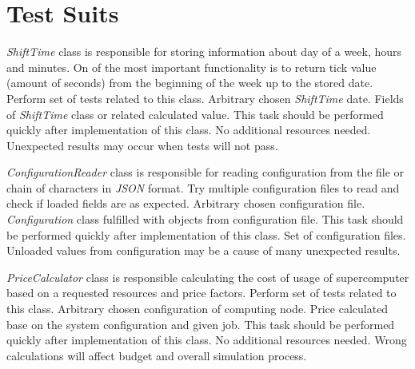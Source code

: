\chapter{Test Suits} \label{chp:test-suits}
	{
		{
			\emph{ShiftTime} class is responsible for storing information about day of a week, hours and minutes. On of the most important functionality is to return tick value (amount of seconds) from the beginning of the week up to the stored date.
		}
		{
			Perform set of tests related to this class. 
		}
		{
			Arbitrary chosen \emph{ShiftTime} date.   
		}
		{
			Fields of \emph{ShiftTime} class or related calculated value.
		}
		{
			This task should be performed quickly after implementation of this class.
		}
		{
			No additional resources needed.
		}
		{
			Unexpected results may occur when tests will not pass. 
		}
	}

	{
		{
			\emph{ConfigurationReader} class is responsible for reading configuration from the file or chain of characters in \emph{JSON} format.
		}
		{
			Try multiple configuration files to read and check if loaded fields are as expected.
		}
		{
			Arbitrary chosen configuration file.   
		}
		{
			\emph{Configuration} class fulfilled with objects from configuration file.
		}
		{
			This task should be performed quickly after implementation of this class.
		}
		{
			Set of configuration files.
		}
		{
			Unloaded values from configuration may be a cause of many unexpected results.
		}
	}

	{
		{
			\emph{PriceCalculator} class is responsible calculating the cost of usage of supercomputer based on a requested resources and price factors.
		}
		{
			Perform set of tests related to this class. 
		}
		{
			Arbitrary chosen configuration of \gls{computing node}.
		}
		{
			Price calculated base on the system configuration and given job.
		}
		{
			This task should be performed quickly after implementation of this class.
		}
		{
			No additional resources needed.
		}
		{
			Wrong calculations will affect budget and overall simulation process.
		}
	}

